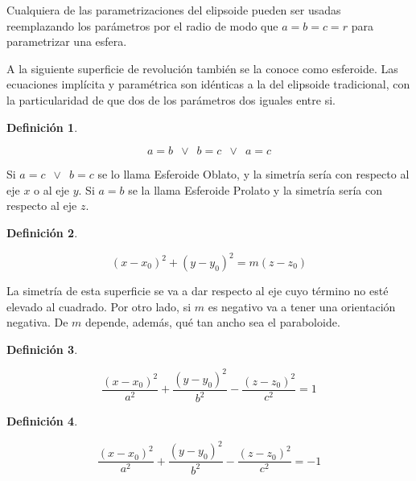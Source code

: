 \documentclass[a5paper,12pt,twoside]{book}
\newtheorem{defn}{{Definición}}[chapter]
\begin{document}
Cualquiera de las parametrizaciones del elipsoide pueden ser usadas reemplazando los parámetros por el radio de modo que $a=b=c=r$ para parametrizar una esfera.

A la siguiente superficie de revolución también se la conoce como esferoide. Las ecuaciones implícita y paramétrica son idénticas a la del elipsoide tradicional, con la particularidad de que dos de los parámetros dos iguales entre si.

\begin{mdframed}[style=MyFrame1]
    \begin{defn}
    \end{defn}
    \begin{equation*}
        a=b \enspace \lor \enspace b=c \enspace \lor \enspace a=c
    \end{equation*}
\end{mdframed}

Si $a=c \enspace \lor \enspace b=c$ se lo llama Esferoide Oblato, y la simetría sería con respecto al eje $x$ o al eje $y$. Si $a=b$ se la llama Esferoide Prolato y la simetría sería con respecto al eje $z$.

\begin{mdframed}[style=MyFrame1]
    \begin{defn}
    \end{defn}
    \begin{equation*}
        (x-x_0)^2 + (y-y_0)^2 = m(z-z_0)
    \end{equation*}
\end{mdframed}

La simetría de esta superficie se va a dar respecto al eje cuyo término no esté elevado al cuadrado. Por otro lado, si $m$ es negativo va a tener una orientación negativa. De $m$ depende, además, qué tan ancho sea el paraboloide.

\begin{mdframed}[style=MyFrame1]
    \begin{defn}
    \end{defn}
    \begin{equation*}
        \dfrac{(x-x_0)^2}{a^2} + \dfrac{(y-y_0)^2}{b^2} - \dfrac{(z-z_0)^2}{c^2} = 1
    \end{equation*}
\end{mdframed}

\begin{mdframed}[style=MyFrame1]
    \begin{defn}
    \end{defn}
    \begin{equation*}
        \dfrac{(x-x_0)^2}{a^2} + \dfrac{(y-y_0)^2}{b^2} - \dfrac{(z-z_0)^2}{c^2} = -1
    \end{equation*}
\end{mdframed}
\end{document}
